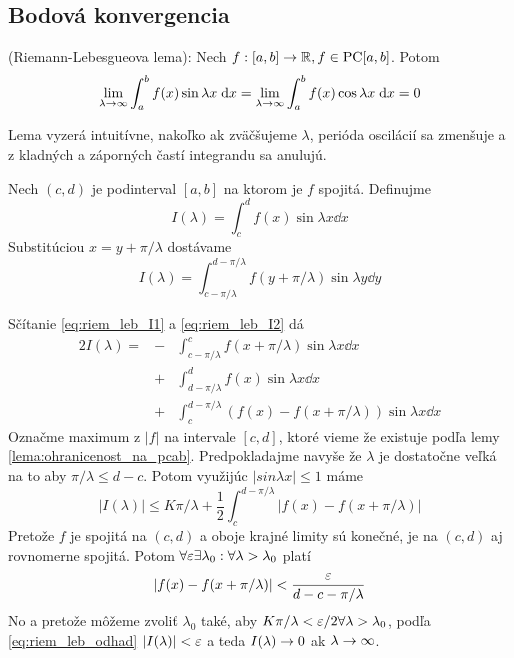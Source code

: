\subsection{Bodová konvergencia}
\begin{lema}
    (Riemann-Lebesgueova lema):
    Nech $f: [a,b]\rightarrow {\mathbb R}, f\in \mbox{PC}[a,b]$. Potom
    \begin{equation}
        \lim_{\lambda\rightarrow\infty} \int_a^b f(x) \sin \lambda x \; \mathrm{d} x=
        \lim_{\lambda\rightarrow\infty} \int_a^b f(x) \cos \lambda x \; \mathrm{d} x=
        0
    \end{equation}
\end{lema}

\begin{dokaz}
    Lema vyzerá intuitívne, nakoľko ak zväčšujeme $\lambda$,
    perióda oscilácií sa zmenšuje a 
    z kladných a záporných častí integrandu sa anulujú.

    \def\pil{\pi/\lambda}

    Nech $(c,d)$ je podinterval $[a,b]$ na ktorom je $f$ spojitá.
    Definujme 
    \begin{equation}
        I(\lambda) = \int_c^d f(x) \sin \lambda x \dd x
        \label{eq:riem_leb_I1}
    \end{equation}
    Substitúciou $x=y+\pil$ dostávame
    \begin{equation}
        I(\lambda) = \int_{c-\pil}^{d-\pil}
            f \left(y+\pil\right) \sin \lambda y \dd y
        \label{eq:riem_leb_I2}
    \end{equation}

    Sčítanie \ref{eq:riem_leb_I1} a \ref{eq:riem_leb_I2} dá
    \begin{eqnarray}
        2I(\lambda) =&-&\int_{c-\pil}^c f(x+\pil) \sin \lambda x \dd x 
                \\ &+&
                \int_{d-\pil}^d f(x) \sin \lambda x \dd x \\&+&
                \int_c^{d-\pil} \left( 
                    f(x) - f(x+\pil)
                    \right) \sin \lambda x \dd x
    \end{eqnarray}
    Označme maximum z $|f|$ na intervale $[c,d]$, ktoré vieme že
    existuje podľa lemy \ref{lema:ohranicenost_na_pcab}.
    Predpokladajme navyše že $\lambda$ je dostatočne veľká na to aby
    $\pil \le d-c$. Potom využijúc $|sin \lambda x|\le1$ máme
    \begin{equation}
        |I(\lambda)| \le K \pil + \frac{1}{2} \int_c^{d-\pil}
            \left|f(x) - f(x+\pil)\right|
        \label{eq:riem_leb_odhad}
    \end{equation}
    Pretože $f$ je spojitá na $(c,d)$ a oboje krajné limity sú konečné,
    je na $(c,d)$ aj rovnomerne spojitá. 
    Potom $\forall \varepsilon \exists \lambda_0: \forall \lambda>\lambda_0$
    platí
    \begin{equation}
        |f(x) - f(x+\pil)| < \frac{\eps}{d-c-\pil}
    \end{equation}
    No a pretože môžeme zvoliť $\lambda_0$ také, aby $K \pil < \eps/2
    \forall \lambda>\lambda_0$, podľa \ref{eq:riem_leb_odhad}
    $|I(\lambda)|<\varepsilon$ a teda $I(\lambda)\rightarrow0$ ak
    $\lambda\rightarrow\infty$.
    

\end{dokaz}
